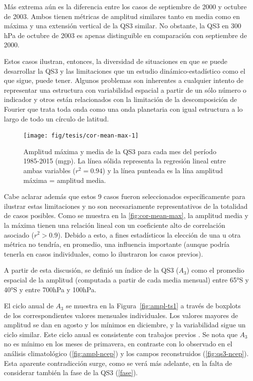 \documentclass[spanish,a4paper,12pt,oneside]{book}
\begin{document}
Más extrema aún es la diferencia entre los casos de septiembre de 2000 y
octubre de 2003. Ambos tienen métricas de amplitud similares tanto en
media como en máxima y una extensión vertical de la QS3 similar. No
obstante, la QS3 en 300 hPa de octubre de 2003 es apenas distinguible en
comparación con septiembre de 2000.

Estos casos ilustran, entonces, la diversidad de situaciones en que se
puede desarrollar la QS3 y las limitaciones que un estudio
dinámico-estadístico como el que sigue, puede tener. Algunos problemas
son inherentes a cualquier intento de representar una estructura con
variabilidad espacial a partir de un sólo número o indicador y otros
están relacionados con la limitación de la descomposición de Fourier que
trata toda onda como una onda planetaria con igual estructura a lo largo
de todo un círculo de latitud.

\begin{figure}
\texttt{[image: fig/tesis/cor-mean-max-1]} \caption{Amplitud máxima y media de la QS3 para cada mes del período 1985-2015 (mgp). La línea sólida representa la regresión lineal entre ambas variables ($r^2 = 0.94 $) y la línea punteada es la lína amplitud máxima = amplitud media.}\label{fig:cor-mean-max}
\end{figure}

Cabe aclarar además que estos 9 casos fueron seleccionados
específicamente para ilustrar estas limitaciones y no son necesariamente
representativos de la totalidad de casos posibles. Como se muestra en la
\autoref{fig:cor-mean-max}, la amplitud media y la máxima tienen una
relación lineal con un coeficiente alto de correlación asociado
(\(r^2>0.9\)). Debido a esto, a fines estadísticos la elección de una u
otra métrica no tendría, en promedio, una influencia importante (aunque
podría tenerla en casos individuales, como lo ilustraron los casos
previos).

A partir de esta discusión, se definió un índice de la QS3 (\(A_3\))
como el promedio espacial de la amplitud (computada a partir de cada
media mensual) entre 65°S y 40°S y entre 700hPa y 100hPa.

El ciclo anual de \(A_3\) se muestra en la Figura~\ref{fig:ampl-ts1} a
través de boxplots de los correspondientes valores mensuales
individuales. Los valores mayores de amplitud se dan en agosto y los
mínimos en diciembre, y la variabilidad sigue un ciclo similar. Este
ciclo anual es consistente con trabajos previos
\autocites{Loon1972}{Karoly1985}{Raphael2004}. Se nota que \(A_3\) no es
mínimo en los meses de primavera, en contraste con lo observado en el
análisis climatológico (\autoref{fig:ampl-ncep}) y los campos
reconstruidos (\autoref{fig:qs3-ncep}). Esta aparente contradicción
surge, como se verá más adelante, en la falta de considerar también la
fase de la QS3 (\autoref{fase}).
\end{document}
